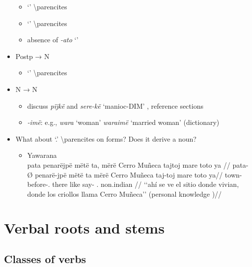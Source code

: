 \documentclass{memoir}
\begin{document}
\begin{itemize}
  \begin{itemize}
  \tightlist
  \item
     `' \textbackslash parencites
  \item
     `' \textbackslash parencites
  \item
    absence of \emph{-ato} `'
  \end{itemize}
\item
  Postp → N

  \begin{itemize}
  \tightlist
  \item
     `' \textbackslash parencites
  \end{itemize}
\item
  N → N

  \begin{itemize}
  \tightlist
  \item
    discuss \emph{pïjkë} and \emph{sere-kë} `manioc-DIM' , reference
    sections
  \item
    \emph{-imë}: e.g., \emph{wara} `woman' \emph{waraimë} `married
    woman' (dictionary)
  \end{itemize}
\item
  What about  `.'
  \textbackslash parencites on  forms? Does it derive a noun?

  \begin{itemize}
  \item
    \ex  Yawarana  \\\label{histyarirdi-592}
    \begingl \glpreamble pata penarëjpë mëtë ta, mërë Cerro Muñeca tajtoj mare toto ya //
    \gla pata-Ø penarë-jpë mëtë ta mërë Cerro Muñeca taj-toj mare toto ya//
    \glb town- before-. there like   say- . non.indian //
    \glft ‘‘ahí se ve el sitio donde vivian, donde los criollos llama Cerro Muñeca’’ (personal knowledge
    )//
    \endgl
    \xe
  \end{itemize}
\end{itemize}

\chapter{\texorpdfstring{Verbal roots and stems
\label{verbderiv}}{Verbal roots and stems }}

\section{Classes of verbs}
\end{document}
